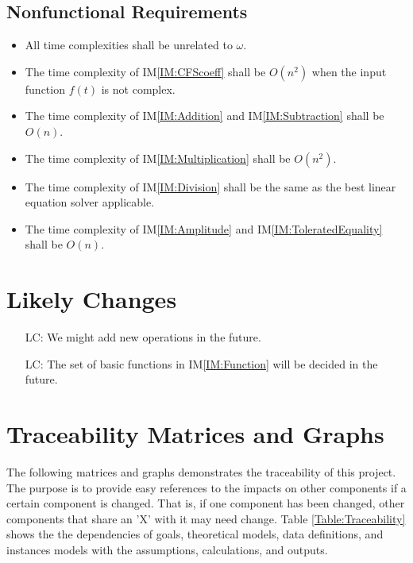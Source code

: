 \documentclass[12pt]{article}
\newcommand{\iref}[1]{IM\ref{#1}}
\newcounter{lcnum} %
\begin{document}
\subsection{Nonfunctional Requirements}

\begin{itemize}
	\item All time complexities shall be unrelated to $\omega$.
	\item The time complexity of \iref{IM:CFScoeff} shall be $O(n^2)$ 
	when the input function $f(t)$ is not complex.
	\item The time complexity of \iref{IM:Addition} and \iref{IM:Subtraction} 
	shall be $O(n)$.
	\item The time complexity of \iref{IM:Multiplication} shall be $O(n^2)$.
	\item The time complexity of \iref{IM:Division} shall be the same 
	as the best linear equation solver applicable.
	\item The time complexity of \iref{IM:Amplitude} 
	and \iref{IM:ToleratedEquality} shall be $O(n)$.
\end{itemize}

\section{Likely Changes}\label{Sc:LC}    
\noindent \begin{itemize}
	\item[LC\refstepcounter{lcnum}\thelcnum\label{LC:NewOperation}:] 
	We might add new operations in the future.
	\item[LC\refstepcounter{lcnum}\thelcnum\label{LC:BasicFunction}:] 
	The set of basic functions in \iref{IM:Function} will be 
	decided in the future.
\end{itemize}

\section{Traceability Matrices and Graphs}\label{Sc:Trace}
The following matrices and graphs demonstrates the traceability 
of this project. The purpose is to provide easy references 
to the impacts on other components if a certain component is changed. 
That is, if one component has been changed, other components that share 
an 'X' with it may need change. Table \ref{Table:Traceability} 
shows the the dependencies of goals, theoretical models, 
data definitions, and instances models with the assumptions, 
calculations, and outputs.
\end{document}

